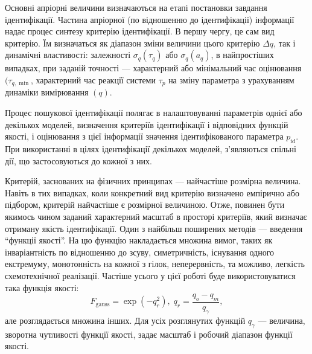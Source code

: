 \documentclass[a4paper,13pt]{atuaref}
\begin{document}

Основні апріорні величини визначаються на етапі постановки завдання
ідентифікації.
Частина апріорної (по відношенню до ідентифікації) інформації
надає процес синтезу критерію ідентифікації. В першу чергу, це сам вид
критерію. Їм визначаться як діапазон зміни величини цього критерію
$ \Delta q$, так і динамічні властивості: залежності
$ \sigma_q (\tau_q) $ або $\sigma_q(a_q) $,
в найпростіших випадках, при заданій точності --- характерний або
мінімальний час оцінювання $(\tau_{q, \min} $,
характерний час реакції
системи $ \tau_p $ на зміну параметра з урахуванням динаміки вимірювання $(q)$.

Процес пошукової ідентифікації полягає в налаштовуванні параметрів однієї або
декількох моделей, визначення критеріїв ідентифікації і відповідних функцій
якості, і оцінювання з цієї інформації значення ідентифікованого параметра
$ p_\mathrm{id}$. При використанні в цілях
ідентифікації декількох моделей, з'являються спільні дії, що застосовуються до
кожної з них.

Критерій, заснованих на фізичних принципах --- найчастіше розмірна величина.
Навіть в тих випадках, коли конкретний вид критерію визначено емпірично або
підбором, критерій найчастіше є розмірної величиною.
Отже,
повинен бути якимось чином заданий характерний масштаб в просторі критеріїв,
який визначає отриману якість ідентифікації.
Один з найбільш поширених методів --- введення ``функції якості''.
На цю функцію накладається множина вимог, таких як
інваріантність по відношенню до зсуву, симетричність,
існування одного екстремуму, монотонність на кожної з гілок,
неперервність, та можливо, легкість схемотехнічної реалізації.
Частіше усього у цієї роботі буде використовуватися така функція якості:
\begin{equation}
  F_{\mathrm{gauss}} = \exp( - q_r^2 ),
  \;
  q_r = \frac{q_o - q_m}{q_\gamma},
\label{atu:eq:F_gauss}
\end{equation}
%
але розглядається множина інших.
Для усіх розглянутих функцій $ q_\gamma $ --- величина,
зворотна чутливості функції якості, задає масштаб і робочий діапазон функції якості.
\end{document}
